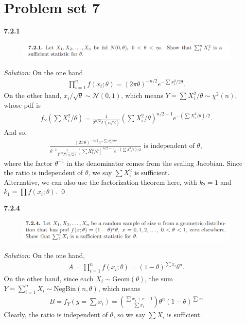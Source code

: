 \documentclass{book}
\theoremstyle{definition}
\newcommand{\N}{\mathcal{N}}
\newcommand{\f}[2]{\frac{#1}{#2}}
\newcommand{\lp}{\left(}
\newcommand{\rp}{\right)}
\begin{document}
\section{Problem set 7}

\noindent \textbf{7.2.1}
\begin{figure}[!htb]
	\centering
	\includegraphics[scale=1]{721}
\end{figure}



\noindent \textit{Solution:} On the one hand
\begin{align}
\prod^n_{i=1} f(x_i;\theta) = (2\pi \theta)^{-n/2}e^{-\sum x_i^2/2\theta}.
\end{align}
On the other hand, $x_i/\sqrt{\theta} \sim \N(0,1)$, which means $Y = \sum X_i^2/\theta \sim \chi^2(n)$, whose pdf is 
\begin{align}
f_{Y}\lp\sum X_i^2/\theta\rp = \f{1}{2^{n/2}\Gamma(n/2)}\lp\sum X_i^2/\theta\rp^{n/2-1}e^{-\lp\sum X_i^2/\theta\rp/2}.
\end{align}
And so,
\begin{align}
\f{(2\pi \theta)^{-n/2}e^{-\sum x_i^2/2\theta}}{\theta^{-1} \f{1}{2^{n/2}\Gamma(n/2)}\lp\sum X_i^2/\theta\rp^{n/2-1}e^{-\lp\sum X_i^2/\theta\rp/2} } \mbox{ is independent of } \theta,
\end{align}
where the factor $\theta^{-1}$ in the denominator comes from the scaling Jacobian. Since the ratio is independent of $\theta$, we say $\sum X_i^2$ is sufficient. \\



Alternative, we can also use the factorization theorem here, with $k_2 = 1$ and $k_1 = \prod f(x_i; \theta)$. \qed 




\newpage




\noindent\textbf{7.2.4}
\begin{figure}[!htb]
	\centering
	\includegraphics[scale=1]{724}
\end{figure}




\noindent \textit{Solution:} On the one hand,
\begin{align}
A = \prod^n_{i=1}f(x_i;\theta) = (1-\theta)^{\sum x_i}\theta^n.
\end{align}
On the other hand, since each $X_i \sim \mbox{Geom}(\theta)$, the sum $Y = \sum^n_{i=1} X_i \sim \mbox{NegBin}(n,\theta)$, which means 
\begin{align*}
B = f_Y\lp y=\sum x_i \rp = {{\sum x_i+r-1}\choose{\sum x_i}} \theta^n (1-\theta)^{\sum x_i}
\end{align*}
Clearly, the ratio is independent of $\theta$, so we say $\sum X_i$ is sufficient. \\
\end{document}
